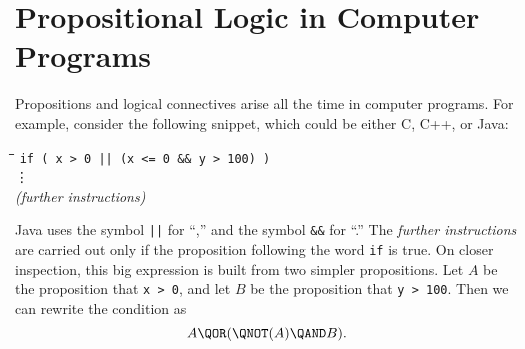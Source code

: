 \begin{problems}

\practiceproblems
{}

\classproblems
{}

\homeworkproblems
{}
\end{problems}


\section{Propositional Logic in Computer Programs}\label{propositions_in_programs_sec}

Propositions and logical connectives arise all the time in computer
programs.  For example, consider the following snippet, which could be
either C, C++, or Java:
%
\begin{tabbing}
\hspace{1in} \= \quad\quad \= \quad\quad \= \quad\quad \= \kill
\> \texttt{if ( x > 0 || (x <= 0 \&\& y > 100) )} \\
\> \> \vdots\\
\> \textit{(further instructions)}
\end{tabbing}
%
Java uses the symbol \texttt{||} for ``\QOR,'' and the
symbol \texttt{\&\&} for ``\QAND.''  The \textit{further instructions}
are carried out only if the proposition following the word \texttt{if}
is true.  On closer inspection, this big expression is built from two
simpler propositions.  Let $A$ be the proposition that \texttt{x > 0},
and let $B$ be the proposition that \texttt{y > 100}.  Then we can
rewrite the condition as
\begin{equation}\label{ANAB}
A \QOR (\QNOT(A) \QAND B).
\end{equation}

